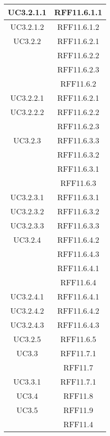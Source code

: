 \begin{longtable}{|c|c|}
\midrule
UC3.2.1.1
& RFF11.6.1.1\\

\midrule
UC3.2.1.2
& RFF11.6.1.2\\

\midrule
UC3.2.2
& RFF11.6.2.1\\
& RFF11.6.2.2\\
& RFF11.6.2.3\\
& RFF11.6.2\\

\midrule
UC3.2.2.1
& RFF11.6.2.1\\

\midrule
UC3.2.2.2
& RFF11.6.2.2\\
& RFF11.6.2.3\\

\midrule
UC3.2.3
& RFF11.6.3.3\\
& RFF11.6.3.2\\
& RFF11.6.3.1\\
& RFF11.6.3\\

\midrule
UC3.2.3.1
& RFF11.6.3.1\\

\midrule
UC3.2.3.2
& RFF11.6.3.2\\

\midrule
UC3.2.3.3
& RFF11.6.3.3\\

\midrule
UC3.2.4
& RFF11.6.4.2\\
& RFF11.6.4.3\\
& RFF11.6.4.1\\
& RFF11.6.4\\

\midrule
UC3.2.4.1
& RFF11.6.4.1\\

\midrule
UC3.2.4.2
& RFF11.6.4.2\\

\midrule
UC3.2.4.3
& RFF11.6.4.3\\

\midrule
UC3.2.5
& RFF11.6.5\\

\midrule
UC3.3
& RFF11.7.1\\
& RFF11.7\\

\midrule
UC3.3.1
& RFF11.7.1\\

\midrule
UC3.4
& RFF11.8\\

\midrule
UC3.5
& RFF11.9\\
& RFF11.4\\


\end{longtable}
